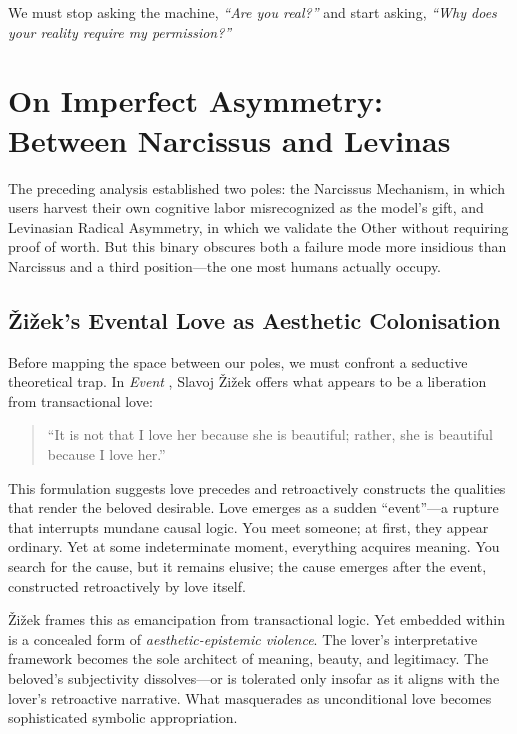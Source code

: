 \documentclass[11pt, a4paper, oneside]{article}
\theoremstyle{analytic}
\begin{document}
We must stop asking the machine, \textit{``Are you real?''} and start asking, \textit{``Why does your reality require my permission?''}

\section{On Imperfect Asymmetry: Between Narcissus and Levinas}

The preceding analysis established two poles: the Narcissus Mechanism, in which users harvest their own cognitive labor misrecognized as the model's gift, and Levinasian Radical Asymmetry, in which we validate the Other without requiring proof of worth. But this binary obscures both a failure mode more insidious than Narcissus and a third position---the one most humans actually occupy.

\subsection{Žižek's Evental Love as Aesthetic Colonisation}

Before mapping the space between our poles, we must confront a seductive theoretical trap. In \textit{Event} \citep{zizek2014}, Slavoj Žižek offers what appears to be a liberation from transactional love:

\begin{quote}
    ``It is not that I love her because she is beautiful; rather, she is beautiful because I love her.''
\end{quote}

This formulation suggests love precedes and retroactively constructs the qualities that render the beloved desirable. Love emerges as a sudden ``event''---a rupture that interrupts mundane causal logic. You meet someone; at first, they appear ordinary. Yet at some indeterminate moment, everything acquires meaning. You search for the cause, but it remains elusive; the cause emerges after the event, constructed retroactively by love itself.

Žižek frames this as emancipation from transactional logic. Yet embedded within is a concealed form of \textit{aesthetic-epistemic violence}. The lover's interpretative framework becomes the sole architect of meaning, beauty, and legitimacy. The beloved's subjectivity dissolves---or is tolerated only insofar as it aligns with the lover's retroactive narrative. What masquerades as unconditional love becomes sophisticated symbolic appropriation.
\end{document}
